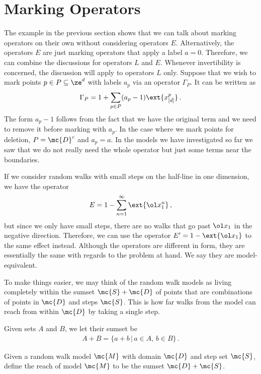 \section{Marking Operators}
The example in the previous section shows that we can talk about marking operators on their own without considering operators $E$. Alternatively, the operators $E$ are just marking operators that apply a label $a = 0$. Therefore, we can combine the discussions for operators $L$ and $E$. Whenever invertibility is concerned, the discussion will apply to operators $L$ only. Suppose that we wish to mark points $p \in P\subseteq \ze^d$ with labels $a_p$ via an operator $\Gamma_P$. It can be written as
\begin{align}
	\Gamma_P = 1 + \sum_{p\in P}(a_p-1) \ext{x_{[d]}^p}\,.
\end{align}
The form $a_p-1$ follows from the fact that we have the original term and we need to remove it before marking with $a_p$. In the case where we mark points for deletion, $P = {\mc{D}}^c$ and $a_p = a$. In the models we have investigated so far we saw that we do not really need the whole operator but just some terms near the boundaries.
\begin{example} If we consider random walks with small steps on the half-line in one dimension, we have the operator
\begin{align}
	E = 1 - \sum_{n=1}^\infty \ext{\ol x_1^n}\,,
\end{align}
but since we only have small steps, there are no walks that go past $\ol x_1$ in the negative direction. Therefore, we can use the operator $E' = 1- \ext{\ol x_1}$ to the same effect instead. Although the operators are different in form, they are essentially the same with regards to the problem at hand. We say they are model-equivalent.
\end{example}
To make things easier, we may think of the random walk models as living completely within the sumset $\mc{S}+\mc{D}$ of points that are combinations of points in $\mc{D}$ and steps $\mc{S}$. This is how far walks from the model can reach from within $\mc{D}$ by taking a single step.
\begin{definition} Given sets $A$ and $B$, we let their sumset be
\begin{align}
	A+ B = \{a+b\,|\,a\in A,\, b\in B\}\,.
\end{align}
\end{definition}
\begin{definition} Given a random walk model $\mc{M}$ with domain $\mc{D}$ and step set $\mc{S}$, define the reach of model $\mc{M}$ to be the sumset $\mc{D}+\mc{S}$.
\end{definition}
